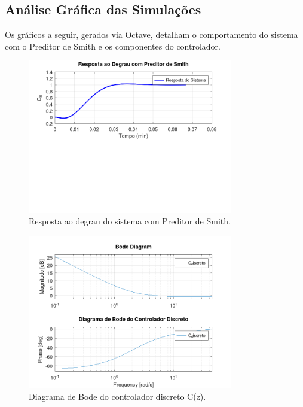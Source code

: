 \documentclass[a4paper,12pt]{report}
\begin{document}
\subsection{Análise Gráfica das Simulações}
Os gráficos a seguir, gerados via Octave, detalham o comportamento do sistema com o Preditor de Smith e os componentes do controlador.

\begin{figure}[H]
    \centering
    \includegraphics[width=0.8\textwidth]{figura_resposta_degrau.png}
    \caption{Resposta ao degrau do sistema com Preditor de Smith.}
    \label{fig:resp_degrau_smith}
\end{figure}

\begin{figure}[H]
    \centering
    \includegraphics[width=0.8\textwidth]{figura_bode_controlador.png}
    \caption{Diagrama de Bode do controlador discreto C(z).}
    \label{fig:bode_controlador}
\end{figure}
\end{document}
